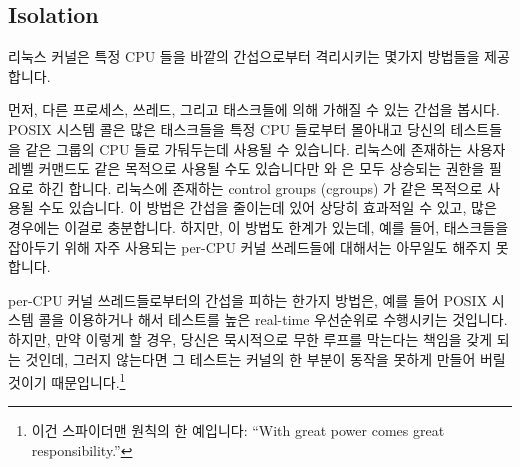 \subsection{Isolation}
\label{sec:debugging:Isolation}

리눅스 커널은 특정 CPU 들을 바깥의 간섭으로부터 격리시키는 몇가지 방법들을
제공합니다.

먼저, 다른 프로세스, 쓰레드, 그리고 태스크들에 의해 가해질 수 있는 간섭을
봅시다.
POSIX  시스템 콜은 많은 태스크들을 특정 CPU 들로부터
몰아내고 당신의 테스트들을 같은 그룹의 CPU 들로 가둬두는데 사용될 수 있습니다.
리눅스에 존재하는 사용자 레벨  커맨드도 같은 목적으로 사용될 수도
있습니다만  와  은 모두 상승되는 권한을
필요로 하긴 합니다.
리눅스에 존재하는 control groups (cgroups) 가 같은 목적으로 사용될 수도
있습니다.
이 방법은 간섭을 줄이는데 있어 상당히 효과적일 수 있고, 많은 경우에는 이걸로
충분합니다.
하지만, 이 방법도 한계가 있는데, 예를 들어, 태스크들을 잡아두기 위해 자주
사용되는 per-CPU 커널 쓰레드들에 대해서는 아무일도 해주지 못합니다.

per-CPU 커널 쓰레드들로부터의 간섭을 피하는 한가지 방법은, 예를 들어 POSIX
 시스템 콜을 이용하거나 해서 테스트를 높은 real-time
우선순위로 수행시키는 것입니다.
하지만, 만약 이렇게 할 경우, 당신은 묵시적으로 무한 루프를 막는다는 책임을 갖게
되는 것인데, 그러지 않는다면 그 테스트는 커널의 한 부분이 동작을 못하게 만들어
버릴 것이기 때문입니다.\footnote{
	이건 스파이더맨 원칙의 한 예입니다: ``With great power comes great
	responsibility.''}

